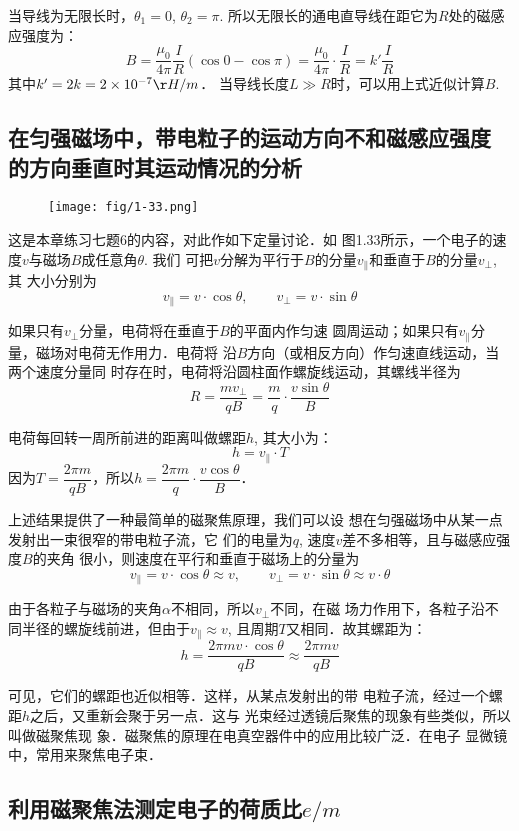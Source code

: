 当导线为无限长时，$\theta_1=0$, $\theta_2=\pi$. 所以无限长的通电直导线在距它为$R$处的磁感应强度为：
\[B=\frac{\mu_0}{4\pi}\frac{I}{R}(\cos0-\cos\pi)=\frac{\mu_0}{4\pi}\cdot \frac{I}{R}=k'\frac{I}{R}\]
其中$k'=2k=2\x 10^{-7}{\r H/m}$．
当导线长度$L\gg R$时，可以用上式近似计算$B$.

\subsection{在匀强磁场中，带电粒子的运动方向不和磁感应强度
的方向垂直时其运动情况的分析}

\begin{figure}[htp]
    \centering
    \texttt{[image: fig/1-33.png]}
    \caption{}
\end{figure}

这是本章练习七题6的内容，对此作如下定量讨论．如
图1.33所示，一个电子的速度$v$与磁场$B$成任意角$\theta$. 我们
可把$v$分解为平行于$B$的分量$v_{\parallel}$和垂直于$B$的分量$v_{\bot}$, 其
大小分别为
\[v_{\parallel}=v\cdot \cos\theta,\qquad v_{\bot}=v\cdot \sin\theta\]

如果只有$v_{\bot}$分量，电荷将在垂直于$B$的平面内作匀速
圆周运动；如果只有$v_{\parallel}$分量，磁场对电荷无作用力．电荷将
沿$B$方向（或相反方向）作匀速直线运动，当两个速度分量同
时存在时，电荷将沿圆柱面作螺旋线运动，其螺线半径为
\[R=\frac{mv_{\bot}}{qB}=\frac{m}{q}\cdot \frac{v\sin\theta}{B}\]

电荷每回转一周所前进的距离叫做螺距$h$, 其大小为：
\[h=v_{\parallel}\cdot T\]
因为$T=\dfrac{2\pi m}{qB}$，所以$h=\dfrac{2\pi m}{q}\cdot \dfrac{v\cos\theta}{B}$．

上述结果提供了一种最简单的磁聚焦原理，我们可以设
想在匀强磁场中从某一点发射出一束很窄的带电粒子流，它
们的电量为$q$, 速度$v$差不多相等，且与磁感应强度$B$的夹角
很小，则速度在平行和垂直于磁场上的分量为
\[v_{\parallel}=v\cdot \cos\theta\approx v,\qquad v_{\bot}=v\cdot \sin\theta\approx v\cdot \theta\]

由于各粒子与磁场的夹角$\alpha$不相同，所以$v_{\bot}$不同，在磁
场力作用下，各粒子沿不同半径的螺旋线前进，但由于$v_{\parallel}\approx v$, 且周期$T$又相同．故其螺距为：
\[h=\frac{2\pi mv\cdot \cos\theta}{qB}\approx \frac{2\pi mv}{qB}\]

可见，它们的螺距也近似相等．这样，从某点发射出的带
电粒子流，经过一个螺距$h$之后，又重新会聚于另一点．这与
光束经过透镜后聚焦的现象有些类似，所以叫做磁聚焦现
象．磁聚焦的原理在电真空器件中的应用比较广泛．在电子
显微镜中，常用来聚焦电子束．

\subsection{利用磁聚焦法测定电子的荷质比$e/m$}

